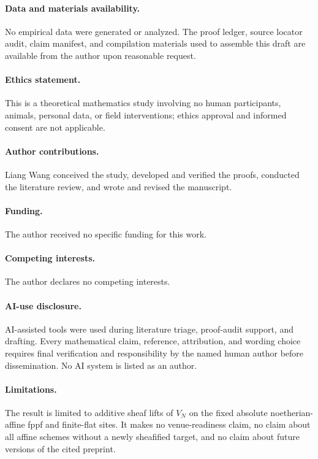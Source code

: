 \documentclass[11pt]{article}
\theoremstyle{definition}
\begin{document}
\paragraph{Data and materials availability.}
No empirical data were generated or analyzed.  The proof ledger, source
locator audit, claim manifest, and compilation materials used to assemble
this draft are available from the author upon reasonable request.

\paragraph{Ethics statement.}
This is a theoretical mathematics study involving no human participants,
animals, personal data, or field interventions; ethics approval and
informed consent are not applicable.

\paragraph{Author contributions.}
Liang Wang conceived the study, developed and verified the proofs, conducted the literature review, and wrote and revised the manuscript.

\paragraph{Funding.}
The author received no specific funding for this work.

\paragraph{Competing interests.}
The author declares no competing interests.

\paragraph{AI-use disclosure.}
AI-assisted tools were used during literature triage, proof-audit support,
and drafting.  Every mathematical claim, reference, attribution, and
wording choice requires final verification and responsibility by the named
human author before dissemination.  No AI system is listed as an author.

\paragraph{Limitations.}
The result is limited to additive sheaf lifts of \(V_N\) on the fixed
absolute noetherian-affine fppf and finite-flat sites.  It makes no
venue-readiness claim, no claim about all affine schemes without a newly
sheafified target, and no claim about future versions of the cited
preprint.



\end{document}
